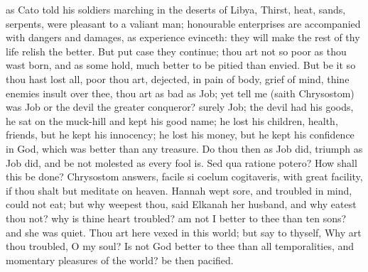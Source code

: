 {as Cato told his soldiers marching in the deserts of Libya, Thirst,
heat, sands, serpents, were pleasant to a valiant man; honourable
enterprises are accompanied with dangers and damages, as experience
evinceth: they will make the rest of thy life relish the better. But
put case they continue; thou art not so poor as thou wast born, and as
some hold, much better to be pitied than envied. But be it so thou hast
lost all, poor thou art, dejected, in pain of body, grief of mind,
thine enemies insult over thee, thou art as bad as Job; yet tell me
(saith Chrysostom) was Job or the devil the greater conqueror? surely
Job; the devil had his goods, he sat on the muck-hill and kept
his good name; he lost his children, health, friends, but he kept his
innocency; he lost his money, but he kept his confidence in God, which
was better than any treasure. Do thou then as Job did, triumph as Job
did, and be not molested as every fool is. Sed qua ratione
potero? How shall this be done? Chrysostom answers, facile si coelum
cogitaveris, with great facility, if thou shalt but meditate on heaven.
Hannah wept sore, and troubled in mind, could not eat; but why
weepest thou, said Elkanah her husband, and why eatest thou not? why is
thine heart troubled? am not I better to thee than ten sons? and she
was quiet. Thou art here vexed in this world; but say to thyself,
Why art thou troubled, O my soul? Is not God better to thee than all
temporalities, and momentary pleasures of the world? be then pacified.

}
